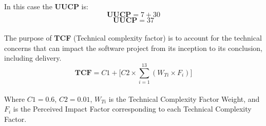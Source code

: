 \documentclass[12pt]{article}
\begin{document}
In this case the \textbf{UUCP} is:
\begin{equation}
    \textbf{UUCP} = 7 + 30
\end{equation}
\begin{equation}
    \textbf{UUCP} = 37
\end{equation}\\

The purpose of \textbf{TCF} (Technical complexity factor) is to account for the technical concerns that can impact the software project from its inception to its conclusion, including delivery.
\begin{equation}
    \textbf{TCF} = C1 + \Bigg[C2 \times \sum^{13}_{i=1}{(W_{Ti} \times F_{i})\Bigg]} 
\end{equation}\\
Where $C1 = 0.6$, $C2 = 0.01$, $W_{Ti}$ is the Technical Complexity Factor Weight, and $F_{i}$ is the Perceived Impact Factor corresponding to each Technical Complexity Factor. 
\end{document}
